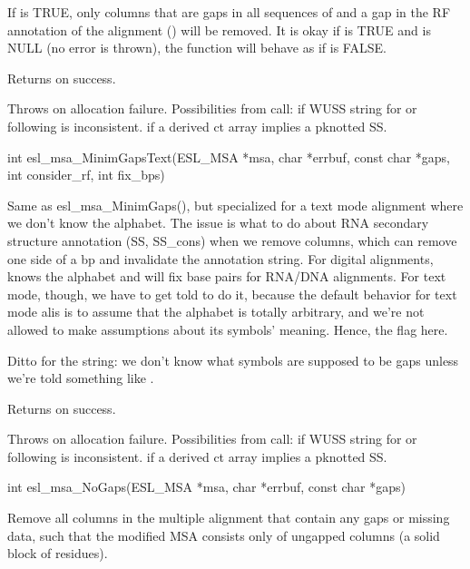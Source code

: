 \begin{sreapi}
If  is TRUE, only columns that are gaps
in all sequences of  and a gap in the RF annotation 
of the alignment () will be removed. It is 
okay if  is TRUE and  is NULL
(no error is thrown), the function will behave as if 
 is FALSE.

Returns  on success.

Throws  on allocation failure.
Possibilities from  call:
 if WUSS string for  or 
following  is inconsistent.
 if a derived ct array implies a pknotted SS.



\hypertarget{func:esl_msa_MinimGapsText()}
{\item[int esl\_msa\_MinimGapsText(ESL\_MSA *msa, char *errbuf, const char *gaps, int consider\_rf, int fix\_bps)]}

Same as esl\_msa\_MinimGaps(), but specialized for a text mode
alignment where we don't know the alphabet. The issue is what 
to do about RNA secondary structure annotation (SS, SS\_cons)
when we remove columns, which can remove one side of a bp and
invalidate the annotation string. For digital alignments,
 knows the alphabet and will fix base pairs
for RNA/DNA alignments. For text mode, though, we have to 
get told to do it, because the default behavior for text mode
alis is to assume that the alphabet is totally arbitrary, and we're
not allowed to make assumptions about its symbols' meaning.
Hence, the  flag here. 

Ditto for the  string: we don't know what symbols
are supposed to be gaps unless we're told something like 
.

Returns  on success.

Throws  on allocation failure. 
Possibilities from  call:
 if WUSS string for  or 
following  is inconsistent.
 if a derived ct array implies a pknotted SS.


\hypertarget{func:esl_msa_NoGaps()}
{\item[int esl\_msa\_NoGaps(ESL\_MSA *msa, char *errbuf, const char *gaps)]}

Remove all columns in the multiple alignment  that
contain any gaps or missing data, such that the modified
MSA consists only of ungapped columns (a solid block of
residues). 


\end{sreapi}

